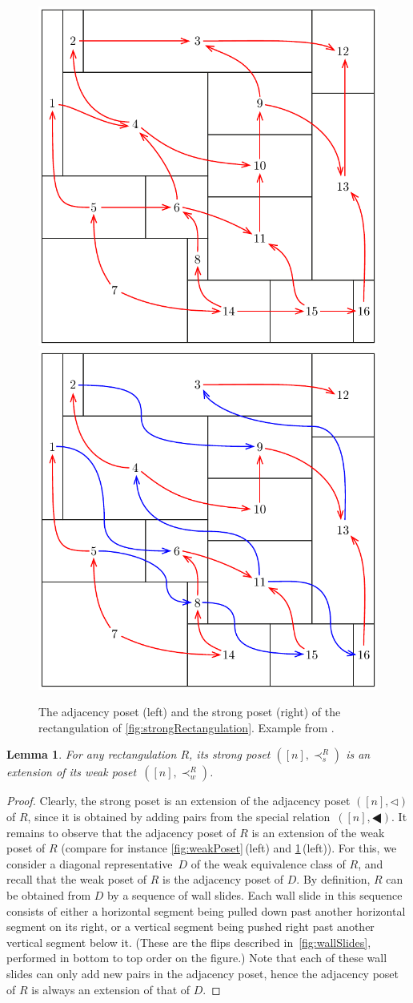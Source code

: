 \documentclass{amsart}
\newtheorem{lemma}[theorem]{Lemma}
\theoremstyle{definition}
\newcommand{\tri}{\lhd}
\newcommand{\btri}{\LHD}
\begin{document}
\begin{figure}
	\centerline{\includegraphics[width=.4\textwidth]{adjacencyPoset} \qquad \includegraphics[width=.4\textwidth]{strongPoset}}
	\caption{The adjacency poset (left) and the strong poset (right) of the rectangulation of \cref{fig:strongRectangulation}. Example from \cite{ACFF24}.}
	\label{fig:strongPoset}
\end{figure}

\begin{lemma}
  \label{lem:sextw}
  For any rectangulation $R$, its strong poset $([n], \prec_s^R)$ is an extension of its weak poset~$([n], \prec_w^R)$.
\end{lemma}
\begin{proof}
  Clearly, the strong poset is an extension of the adjacency poset $([n],\tri)$ of $R$, since it is obtained by adding pairs from the special relation~$([n],\btri)$.
  It remains to observe that the adjacency poset of $R$ is an extension of the weak poset of $R$ (compare for instance \cref{fig:weakPoset}\,(left) and \cref{fig:strongPoset}\,(left)).
  For this, we consider a diagonal representative~$D$ of the weak equivalence class of $R$, and recall that the weak poset of $R$ is the adjacency poset of $D$.
  By definition, $R$ can be obtained from $D$ by a sequence of wall slides.
  Each wall slide in this sequence consists of either a horizontal segment being pulled down past another horizontal segment on its right, or a vertical segment being pushed right past another vertical segment below it.
  (These are the flips described in~\cref{fig:wallSlides}, performed in bottom to top order on the figure.) 
  Note that each of these wall slides can only add new pairs in the adjacency poset, hence the adjacency poset of $R$ is always an extension of that of $D$. 
\end{proof}
\end{document}
